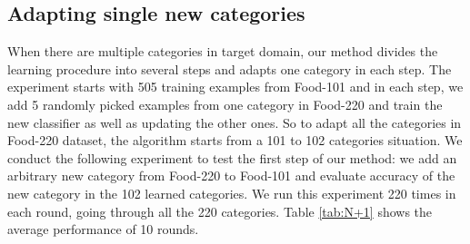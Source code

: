 \subsection{Adapting single new categories}
When there are multiple categories in target domain, our method divides the learning procedure into several steps and adapts one category in each step. The experiment starts with 505 training examples from Food-101 and in each step, we add 5 randomly picked examples from one category in Food-220 and train the new classifier as well as updating the other ones. So to adapt all the categories in Food-220 dataset, the algorithm starts from a 101 to 102 categories situation. We conduct the following experiment to test the first step of our method: we add an arbitrary new category from Food-220 to Food-101 and evaluate accuracy of the new category in the 102 learned categories. We run this experiment 220 times in each round, going through all the 220 categories. Table \ref{tab:N+1} shows the average performance of 10 rounds.

